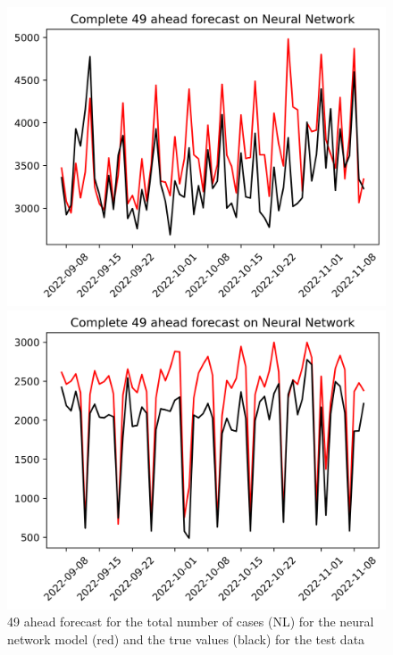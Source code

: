 \begin{figure}

\begin{minipage}{.32\textwidth}
  \centering
  \includegraphics[width=\linewidth]{pics/49_ah/Complete_49_ahead_Neural Network.png}
  \caption{49 ahead forecast for the total number of cases (NL) for the neural network model (red) and the true values (black) for the test data}
  \label{fig:tot_cases_fc_49_nn}
\end{minipage}
\begin{minipage}{.32\textwidth}
  \centering
  \includegraphics[width=\linewidth]{pics/49_ah/DE_Complete_49_ahead_Neural Network.png}

\end{minipage}
\end{figure}
